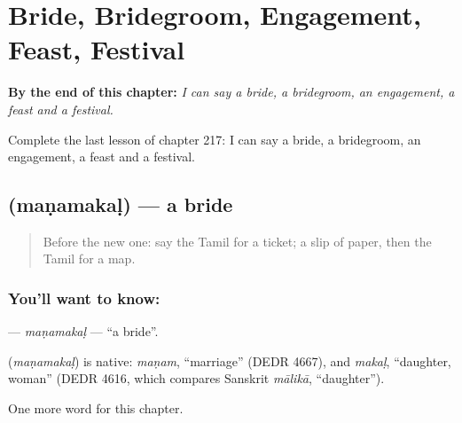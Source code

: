 
\chapter{Bride, Bridegroom, Engagement, Feast, Festival}
\label{ch:ta-bride-bridegroom-engagement-feast-festival}

\begin{chapteropening}
\textbf{By the end of this chapter:} \emph{I can say a bride, a bridegroom, an engagement, a feast and a festival.}

Complete the last lesson of chapter 217: I can say a bride, a bridegroom, an engagement, a feast and a festival.
\end{chapteropening}

\section[\texorpdfstring{\ta{மணமகள்} (maṇamakaḷ)}{மணமகள் (maṇamakaḷ)}]{ (maṇamakaḷ) — a bride}

\label{lesson:TA-C217-manamakal}



\begin{quote}
Before the new one: say the Tamil for a ticket; a slip of paper, then the Tamil for a map.
\end{quote}

\subsection*{You'll want to know: }
\textbf{} — \emph{maṇamakaḷ} — \textquotedblleft{}a bride\textquotedblright{}.

\begin{cousinweb}
\textbf{} (\emph{maṇamakaḷ}) is native: \emph{maṇam}, \textquotedblleft{}marriage\textquotedblright{} (DEDR 4667), and \emph{makaḷ}, \textquotedblleft{}daughter, woman\textquotedblright{} (DEDR 4616, which compares Sanskrit \emph{mālikā}, \textquotedblleft{}daughter\textquotedblright{}).
\end{cousinweb}

\begin{grammarlens}[title={What you've built}]
One more word for this chapter.
\end{grammarlens}

